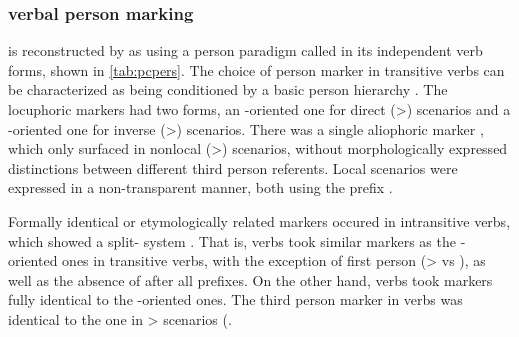 



\subsubsection{\PC verbal person marking}
\label{sec:pc_person}
\PC is reconstructed by \textcite{gildea1998} as using a person paradigm called \setone in its independent verb forms, shown in \cref{tab:pcpers}.
The choice of person marker in transitive verbs can be characterized as being conditioned by a basic person hierarchy .
The locuphoric markers had two forms, an -oriented one for direct (>) scenarios and a -oriented one for inverse (>) scenarios.
There was a single aliophoric marker , which only surfaced in nonlocal (>) scenarios, without morphologically expressed distinctions between different third person referents.
Local scenarios were expressed in a non-transparent manner, both using the  prefix .



Formally identical or etymologically related markers occured in intransitive verbs, which showed a split- system .
That is,  verbs took similar markers as the -oriented ones in transitive verbs, with the exception of first person (>  vs  ), as well as the absence of  after all  prefixes.
On the other hand,  verbs took markers fully identical to the -oriented ones.
The third person marker in  verbs was identical to the one in > scenarios (.

